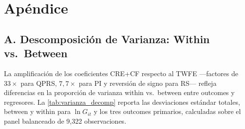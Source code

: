 
\appendix
\section*{Apéndice}

\subsection*{A. Descomposición de Varianza: Within vs.\ Between}
\label{sec:appendix_varianza}

La amplificación de los coeficientes CRE+CF respecto al TWFE ---factores de $33\times$ para QPRS, $7{,}7\times$ para PI y reversión de signo para RS--- refleja diferencias en la proporción de varianza within vs.\ between entre outcomes y regresores.
La \cref{tab:varianza_decomp} reporta las desviaciones estándar totales, between y within para $\ln G_{it}$ y los tres outcomes primarios, calculadas sobre el panel balanceado de 9,322 observaciones.

